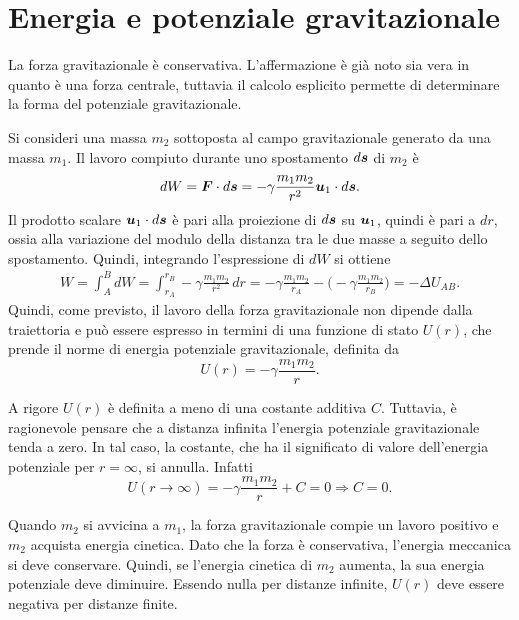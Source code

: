 \section{Energia e potenziale gravitazionale}
La forza gravitazionale è conservativa. L'affermazione è già noto sia vera in quanto è una forza centrale, tuttavia il calcolo esplicito permette di determinare la forma del potenziale gravitazionale. 

Si consideri una massa $m_2$ sottoposta al campo gravitazionale generato da una massa $m_1$. Il lavoro compiuto durante uno spostamento $d\bm{s}$ di $m_2$ è
\begin{equation}
    dW=\bm{F}\cdot d\bm{s}=-\gamma\frac{m_1m_2}{r^2}\bm{u}_1\cdot d\bm{s}.
\end{equation}
Il prodotto scalare $\bm{u}_1\cdot d\bm{s}$ è pari alla proiezione di $d\bm{s}$ su $\bm{u}_1$, quindi è pari a $dr$, ossia alla variazione del modulo della distanza tra le due masse a seguito dello spostamento. Quindi, integrando l'espressione di $dW$ si ottiene
\begin{equation}
    \begin{split}
        W=\int_A^BdW=\int_{r_A}^{r_B}-\gamma\frac{m_1m_2}{r^2}\,dr=-\gamma\frac{m_1m_2}{r_A}-\bigg(-\gamma\frac{m_1m_2}{r_B}\bigg)=-\Delta U_{AB}.
    \end{split}
\end{equation}
Quindi, come previsto, il lavoro della forza gravitazionale non dipende dalla traiettoria e può essere espresso in termini di una funzione di stato $U(r)$, che prende il norme di energia potenziale gravitazionale, definita da
\begin{equation}
\label{eq: energia potenziale gravitazionale}
    U(r)=-\gamma\frac{m_1m_2}{r}.
\end{equation}
\begin{obs}
    A rigore $U(r)$ è definita a meno di una costante additiva $C$. Tuttavia, è ragionevole pensare che a distanza infinita l'energia potenziale gravitazionale tenda a zero. In tal caso, la costante, che ha il significato di valore dell'energia potenziale per $r=\infty$, si annulla. Infatti
    \begin{equation}
        U(r\to\infty)=-\gamma\frac{m_1m_2}{r}+C=0\Rightarrow C=0.
    \end{equation}
\end{obs}
Quando $m_2$ si avvicina a $m_1$, la forza gravitazionale compie un lavoro positivo e $m_2$ acquista energia cinetica. Dato che la forza è conservativa, l'energia meccanica si deve conservare. Quindi, se l'energia cinetica di $m_2$ aumenta, la sua energia potenziale deve diminuire. Essendo nulla per distanze infinite, $U(r)$ deve essere negativa per distanze finite.  

